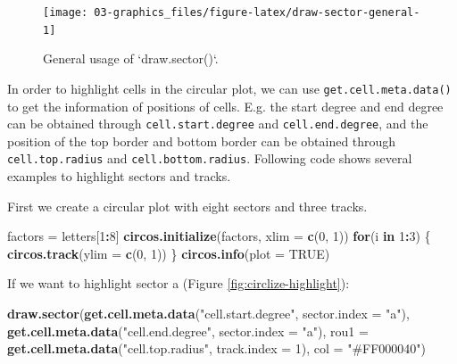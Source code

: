 \documentclass[]{book}
\newenvironment{Shaded}{\begin{snugshade}}{\end{snugshade}}
\newcommand{\KeywordTok}[1]{\textcolor[rgb]{0.13,0.29,0.53}{\textbf{#1}}}
\newcommand{\DataTypeTok}[1]{\textcolor[rgb]{0.13,0.29,0.53}{#1}}
\newcommand{\DecValTok}[1]{\textcolor[rgb]{0.00,0.00,0.81}{#1}}
\newcommand{\StringTok}[1]{\textcolor[rgb]{0.31,0.60,0.02}{#1}}
\newcommand{\OtherTok}[1]{\textcolor[rgb]{0.56,0.35,0.01}{#1}}
\newcommand{\ControlFlowTok}[1]{\textcolor[rgb]{0.13,0.29,0.53}{\textbf{#1}}}
\newcommand{\OperatorTok}[1]{\textcolor[rgb]{0.81,0.36,0.00}{\textbf{#1}}}
\newcommand{\NormalTok}[1]{#1}
\begin{document}
\begin{figure}

{\centering \texttt{[image: 03-graphics\_files/figure-latex/draw-sector-general-1]} 

}

\caption{General usage of `draw.sector()`.}\label{fig:draw-sector-general}
\end{figure}

In order to highlight cells in the circular plot, we can use
\texttt{get.cell.meta.data()} to get the information of positions of
cells. E.g. the start degree and end degree can be obtained through
\texttt{cell.start.degree} and \texttt{cell.end.degree}, and the
position of the top border and bottom border can be obtained through
\texttt{cell.top.radius} and \texttt{cell.bottom.radius}. Following code
shows several examples to highlight sectors and tracks.

First we create a circular plot with eight sectors and three tracks.

\begin{Shaded}
\begin{Highlighting}[]
\NormalTok{factors =}\StringTok{ }\NormalTok{letters[}\DecValTok{1}\OperatorTok{:}\DecValTok{8}\NormalTok{]}
\KeywordTok{circos.initialize}\NormalTok{(factors, }\DataTypeTok{xlim =} \KeywordTok{c}\NormalTok{(}\DecValTok{0}\NormalTok{, }\DecValTok{1}\NormalTok{))}
\ControlFlowTok{for}\NormalTok{(i }\ControlFlowTok{in} \DecValTok{1}\OperatorTok{:}\DecValTok{3}\NormalTok{) \{}
    \KeywordTok{circos.track}\NormalTok{(}\DataTypeTok{ylim =} \KeywordTok{c}\NormalTok{(}\DecValTok{0}\NormalTok{, }\DecValTok{1}\NormalTok{))}
\NormalTok{\}}
\KeywordTok{circos.info}\NormalTok{(}\DataTypeTok{plot =} \OtherTok{TRUE}\NormalTok{)}
\end{Highlighting}
\end{Shaded}

If we want to highlight sector a (Figure \ref{fig:circlize-highlight}):

\begin{Shaded}
\begin{Highlighting}[]
\KeywordTok{draw.sector}\NormalTok{(}\KeywordTok{get.cell.meta.data}\NormalTok{(}\StringTok{"cell.start.degree"}\NormalTok{, }\DataTypeTok{sector.index =} \StringTok{"a"}\NormalTok{),}
            \KeywordTok{get.cell.meta.data}\NormalTok{(}\StringTok{"cell.end.degree"}\NormalTok{, }\DataTypeTok{sector.index =} \StringTok{"a"}\NormalTok{),}
            \DataTypeTok{rou1 =} \KeywordTok{get.cell.meta.data}\NormalTok{(}\StringTok{"cell.top.radius"}\NormalTok{, }\DataTypeTok{track.index =} \DecValTok{1}\NormalTok{), }
            \DataTypeTok{col =} \StringTok{"#FF000040"}\NormalTok{)}
\end{Highlighting}
\end{Shaded}
\end{document}
